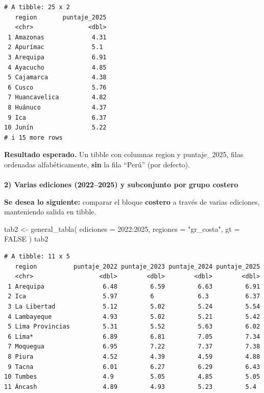 \documentclass[
  11pt,
  letterpaper,
  DIV=11,
  numbers=noendperiod]{scrartcl}
\makeatletter
\let\oldparagraph\paragraph
\renewcommand{\paragraph}{
    \@ifstar
      \xxxParagraphStar
      \xxxParagraphNoStar
  }
\newcommand{\xxxParagraphStar}[1]{\oldparagraph*{#1}\mbox{}}
\newcommand{\xxxParagraphNoStar}[1]{\oldparagraph{#1}\mbox{}}
\newenvironment{Shaded}{\begin{snugshade}}{\end{snugshade}}
\newcommand{\AttributeTok}[1]{\textcolor[rgb]{0.40,0.45,0.13}{#1}}
\newcommand{\ConstantTok}[1]{\textcolor[rgb]{0.56,0.35,0.01}{#1}}
\newcommand{\DecValTok}[1]{\textcolor[rgb]{0.68,0.00,0.00}{#1}}
\newcommand{\FunctionTok}[1]{\textcolor[rgb]{0.28,0.35,0.67}{#1}}
\newcommand{\NormalTok}[1]{\textcolor[rgb]{0.00,0.23,0.31}{#1}}
\newcommand{\OtherTok}[1]{\textcolor[rgb]{0.00,0.23,0.31}{#1}}
\newcommand{\SpecialCharTok}[1]{\textcolor[rgb]{0.37,0.37,0.37}{#1}}
\newcommand{\StringTok}[1]{\textcolor[rgb]{0.13,0.47,0.30}{#1}}
\makeatother
\begin{document}
\begin{verbatim}
# A tibble: 25 x 2
   region       puntaje_2025
   <chr>               <dbl>
 1 Amazonas             4.31
 2 Apurímac             5.1 
 3 Arequipa             6.91
 4 Ayacucho             4.85
 5 Cajamarca            4.38
 6 Cusco                5.76
 7 Huancavelica         4.82
 8 Huánuco              4.37
 9 Ica                  6.37
10 Junín                5.22
# i 15 more rows
\end{verbatim}

\textbf{Resultado esperado.} Un tibble con columnas region y
puntaje\_2025, filas ordenadas alfabéticamente, \textbf{sin} la fila
``Perú'' (por defecto).

\paragraph{\texorpdfstring{\textbf{2) Varias ediciones (2022--2025) y
subconjunto por grupo
costero}}{2) Varias ediciones (2022--2025) y subconjunto por grupo costero}}\label{varias-ediciones-20222025-y-subconjunto-por-grupo-costero}

\textbf{Se desea lo siguiente:} comparar el bloque \textbf{costero} a
través de varias ediciones, manteniendo salida en tibble.

\begin{Shaded}
\begin{Highlighting}[]
\NormalTok{tab2 }\OtherTok{\textless{}{-}} \FunctionTok{general\_tabla}\NormalTok{(}
  \AttributeTok{ediciones =} \DecValTok{2022}\SpecialCharTok{:}\DecValTok{2025}\NormalTok{,}
  \AttributeTok{regiones  =} \StringTok{"gr\_costa"}\NormalTok{,}
  \AttributeTok{gt        =} \ConstantTok{FALSE}
\NormalTok{)}
\NormalTok{tab2}
\end{Highlighting}
\end{Shaded}

\begin{verbatim}
# A tibble: 11 x 5
   region          puntaje_2022 puntaje_2023 puntaje_2024 puntaje_2025
   <chr>                  <dbl>        <dbl>        <dbl>        <dbl>
 1 Arequipa                6.48         6.59         6.63         6.91
 2 Ica                     5.97         6            6.3          6.37
 3 La Libertad             5.12         5.02         5.24         5.54
 4 Lambayeque              4.93         5.02         5.21         5.42
 5 Lima Provincias         5.31         5.52         5.63         6.02
 6 Lima*                   6.89         6.81         7.05         7.34
 7 Moquegua                6.95         7.22         7.37         7.38
 8 Piura                   4.52         4.39         4.59         4.88
 9 Tacna                   6.01         6.27         6.29         6.43
10 Tumbes                  4.9          5.05         4.85         5.05
11 Áncash                  4.89         4.93         5.23         5.4 
\end{verbatim}
\end{document}
